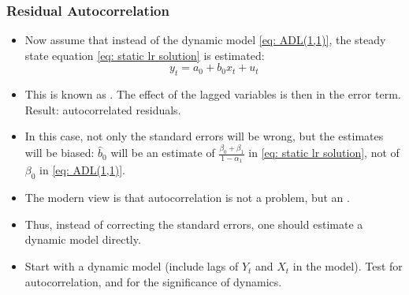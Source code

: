 \begin{frame}
\frametitle{Residual Autocorrelation}
\begin{itemize}
\item Now assume that instead of the dynamic model \eqref{eq: ADL(1,1)}, the steady state equation \eqref{eq: static lr solution} is estimated:
\[
y_t=a_0+b_0 x_t+u_t
\]
\item This is known as . The effect of the lagged variables is then in the error term. Result: autocorrelated residuals.
\item In this case, not only the standard errors will be wrong, but the estimates will be biased: $\hat{b}_0$ will be an estimate of $\frac{\beta _{0}+\beta _{1}}{1-\alpha _{1}}$ in \eqref{eq: static lr solution}, not of $\beta_0$ in \eqref{eq: ADL(1,1)}.
\item The modern view is that autocorrelation is not a problem, but an .
\item Thus, instead of correcting the standard errors, one should estimate a dynamic model directly.
\item Start with a dynamic model (include lags of $Y_{t}$ and $X_{t}$ in the
model). Test for autocorrelation, and for the significance of dynamics.
\end{itemize}
\end{frame}

